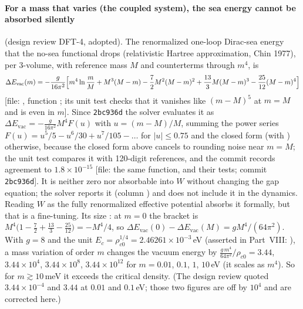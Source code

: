 \paragraph{For a mass that varies (the coupled system), the sea energy cannot be absorbed silently}
(design review DFT-4, adopted). The renormalized one-loop Dirac-sea energy that the no-sea functional
drops (relativistic Hartree approximation, Chin 1977), per 3-volume, with reference mass $M$ and
counterterms through $m^4$, is
\[
  \Delta E_{\mathrm{vac}}(m)=-\frac{g}{16\pi^2}\Bigl[m^4\ln\frac mM+M^3(M-m)-\frac72M^2(M-m)^2+\frac{13}{3}M(M-m)^3-\frac{25}{12}(M-m)^4\Bigr]
\]
[file: , function ;
its unit test  checks that it
vanishes like $(m-M)^5$ at $m=M$ and is even in $m$]. Since \texttt{2bc936d} the solver evaluates it
as $\Delta E_{\mathrm{vac}}=-\frac{g}{16\pi^2}M^4F(u)$ with $u=(m-M)/M$, summing the power series
$F(u)=u^5/5-u^6/30+u^7/105-\dots$ for $|u|\le0.75$ and the closed form (with ) otherwise,
because the closed form above cancels to rounding noise near $m=M$; the unit test
 compares it
with 120-digit references, and the commit records agreement to $1.8\times10^{-15}$ [file: the same
function,  and their tests; commit \texttt{2bc936d}]. It is neither zero nor absorbable into $W$
without changing the gap equation; the solver reports it (column ) and does not
include it in the dynamics. Reading $W$ as the fully renormalized effective potential absorbs it
formally, but that is a fine-tuning. Its size \cfderived: at $m=0$ the bracket is
$M^4\bigl(1-\frac72+\frac{13}{3}-\frac{25}{12}\bigr)=-M^4/4$, so
$\Delta E_{\mathrm{vac}}(0)-\Delta E_{\mathrm{vac}}(M)=gM^4/(64\pi^2)$. With $g=8$ and the unit
$E_c=\rho_{c0}^{1/4}=2.46261\times10^{-3}$\,eV (asserted in Part~VIII:
), a mass variation of order $m$ changes the vacuum energy by
$\frac{g\,m^4}{64\pi^2}\big/\rho_{c0}=3.44$, $3.44\times10^{4}$, $3.44\times10^{8}$,
$3.44\times10^{12}$ for $m=0.01$, $0.1$, $1$, $10$\,eV (it scales as $m^4$). So for
$m\gtrsim10$\,meV it exceeds the critical density. (The design review quoted $3.44\times10^{-4}$ and
$3.44$ at $0.01$ and $0.1$\,eV; those two figures are off by $10^4$ and are corrected here.)

